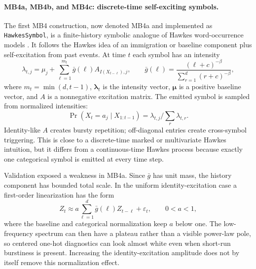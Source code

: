 \documentclass[journal]{IEEEtran}
\newcommand{\code}[1]{\texttt{#1}}
\newcommand{\vect}[1]{\boldsymbol{#1}}
\begin{document}
\paragraph{MB4a, MB4b, and MB4c: discrete-time self-exciting symbols.}
The first MB4 construction, now denoted MB4a and implemented as
\code{HawkesSymbol}, is a finite-history symbolic analogue of Hawkes
word-occurrence models \cite{ogura2022_modeling}. It follows the Hawkes idea of
an immigration or baseline component plus self-excitation from past events. At
time $t$ each symbol has an intensity
\begin{equation}
  \lambda_{t,j} =
  \mu_j + \sum_{\ell=1}^{m_t} \bar{g}(\ell)
          A_{I(X_{t-\ell}),j},
  \qquad
  \bar{g}(\ell)=\frac{(\ell+c)^{-\beta}}
                     {\sum_{r=1}^{d}(r+c)^{-\beta}},
\end{equation}
where \(m_t=\min(d,t-1)\), \(\vect{\lambda}_t\) is the intensity vector,
\(\vect{\mu}\) is a positive baseline vector, and $A$ is a nonnegative excitation
matrix. The emitted symbol is sampled from normalized intensities:
\begin{equation}
  \Pr(X_t=a_j\mid X_{1:t-1}) =
  \lambda_{t,j}/\sum_r\lambda_{t,r}.
\end{equation}
Identity-like $A$ creates bursty repetition; off-diagonal entries create
cross-symbol triggering. This is close to a discrete-time marked or multivariate
Hawkes intuition, but it differs from a continuous-time Hawkes process because
exactly one categorical symbol is emitted at every time step.

Validation exposed a weakness in MB4a. Since \(\bar{g}\) has unit mass, the
history component has bounded total scale. In the uniform identity-excitation
case a first-order linearization has the form
\begin{equation}
  Z_t \approx a \sum_{\ell=1}^{d}\bar{g}(\ell)Z_{t-\ell}+\varepsilon_t,
  \qquad 0<a<1,
\end{equation}
where the baseline and categorical normalization keep $a$ below one. The
low-frequency spectrum can then have a plateau rather than a visible power-law
pole, so centered one-hot diagnostics can look almost white even when short-run
burstiness is present. Increasing the identity-excitation amplitude does not by
itself remove this normalization effect.
\end{document}
